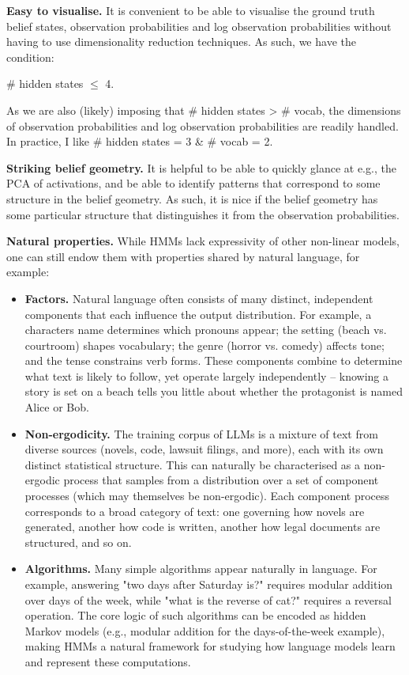 \documentclass[11pt]{article}
\begin{document}
\textbf{Easy to visualise.} It is convenient to be able to visualise the ground truth belief states, observation probabilities and log observation probabilities without having to use dimensionality reduction techniques. As such, we have the condition:

\# hidden states \(\le\) 4.

As we are also (likely) imposing that \# hidden states \textgreater{} \# vocab, the dimensions of observation probabilities and log observation probabilities are readily handled. In practice, I like \# hidden states = 3 \& \# vocab = 2.

\textbf{Striking belief geometry.} It is helpful to be able to quickly glance at e.g., the PCA of activations, and be able to identify patterns that correspond to some structure in the belief geometry. As such, it is nice if the belief geometry has some particular structure that distinguishes it from the observation probabilities.

\textbf{Natural properties.} While HMMs lack expressivity of other non-linear models, one can still endow them with properties shared by natural language, for example:

\begin{itemize}
\item
  \textbf{Factors.} Natural language often consists of many distinct, independent components that each influence the output distribution. For example, a character\textquotesingle s name determines which pronouns appear; the setting (beach vs. courtroom) shapes vocabulary; the genre (horror vs. comedy) affects tone; and the tense constrains verb forms. These components combine to determine what text is likely to follow, yet operate largely independently -- knowing a story is set on a beach tells you little about whether the protagonist is named Alice or Bob.
\item
  \textbf{Non-ergodicity.} The training corpus of LLMs is a mixture of text from diverse sources (novels, code, lawsuit filings, and more), each with its own distinct statistical structure. This can naturally be characterised as a non-ergodic process that samples from a distribution over a set of component processes (which may themselves be non-ergodic). Each component process corresponds to a broad category of text: one governing how novels are generated, another how code is written, another how legal documents are structured, and so on.
\item
  \textbf{Algorithms.} Many simple algorithms appear naturally in language. For example, answering "two days after Saturday is?" requires modular addition over days of the week, while "what is the reverse of \textquotesingle cat\textquotesingle?" requires a reversal operation. The core logic of such algorithms can be encoded as hidden Markov models (e.g., modular addition for the days-of-the-week example), making HMMs a natural framework for studying how language models learn and represent these computations.
\end{itemize}
\end{document}

